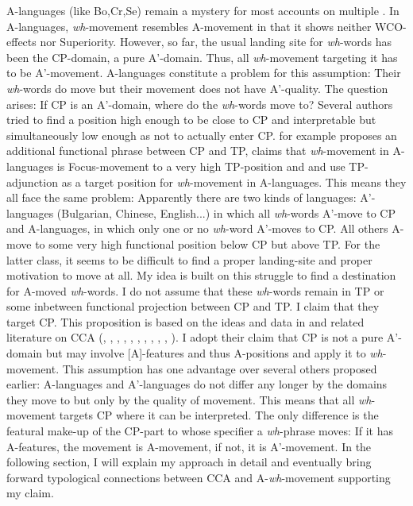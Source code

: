 \documentclass[output=paper,colorlinks,citecolor=brown]{langscibook}
\begin{document}
A-languages (like Bo,Cr,Se) remain a mystery for most accounts on multiple . In A-languages, \textit{wh}-movement resembles A-movement in that it shows neither WCO-effects nor Superiority. However, so far, the usual landing site for \textit{wh}-words has been the CP-domain, a pure A'-domain. Thus, all \textit{wh}-movement targeting it has to be A'-movement. A-languages constitute a problem for this assumption: Their \textit{wh}-words do move but their movement does not have A'-quality. The question arises: If CP is an A'-domain, where do the \textit{wh}-words move to? Several authors tried to find a position high enough to be close to CP and interpretable but simultaneously low enough as not to actually enter CP. \citet{citko1998multiple} for example proposes an additional functional phrase between CP and TP, \citet{bovskovic2002multiple} claims that \textit{wh}-movement in A-languages is Focus-movement to a very high TP-position and \citet{rudin1988multiple} and \citet{richards1997} use TP-adjunction as a target position for \textit{wh}-movement in A-languages. This means they all face the same problem: Apparently there are two kinds of languages: A'-languages (Bulgarian, Chinese, English...) in which all \textit{wh}-words A'-move to CP and A-languages, in which only one or no \textit{wh}-word A'-moves to CP. All others A-move to some very high functional position below CP but above TP. For the latter class, it seems to be difficult to find a proper landing-site and proper motivation to move at all. My idea is built on this struggle to find a destination for A-moved \textit{wh}-words. I do not assume that these \textit{wh}-words remain in TP or some inbetween functional projection between CP and TP. I claim that they target CP. This proposition is based on the ideas and data in \citet{wurmbrand2018cross} and related literature on CCA (\citealp{tanaka2002raising}, \citealp{csener2008non}, \citealp{takeuchi2010exceptional}, \citealp{alboiu2011case}, \citealp{obata2011feature}, \citealp{vanUrk2015}, \citealp{bondarenko2017ecm}, \citealp{zyman2017p}, \citealp{zyman2018rich}, \citealp{wurmbrand2018cross}, \citealp{fong2019proper}). I adopt their claim that CP is not a pure A'-domain but may involve [A]-features and thus A-positions and apply it to \textit{wh}-movement. This assumption has one advantage over several others proposed earlier: A-languages and A'-languages do not differ any longer by the domains they move to but only by the quality of movement. This means that all \textit{wh}-movement targets CP where it can be interpreted. The only difference is the featural make-up of the CP-part to whose specifier a \textit{wh}-phrase moves: If it has A-features, the movement is A-movement, if not, it is A'-movement. In the following section, I will explain my approach in detail and eventually bring forward typological connections between CCA and A-\textit{wh}-movement supporting my claim. 
\end{document}
